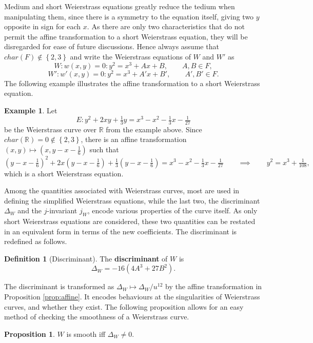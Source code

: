 \documentclass{article}
\newcommand{\R}{\mathbb{R}}
\newcommand{\rb}[1]{\left( #1 \right)}
\newcommand{\cb}[1]{\left\{ #1 \right\}}
\theoremstyle{definition}\newtheorem*{definition}{Definition}
\theoremstyle{definition}\newtheorem*{example}{Example}
\theoremstyle{definition}\newtheorem*{remark}{Remark}
\newtheorem{proposition}{Proposition}[subsection]
\begin{document}
Medium and short Weierstrass equations greatly reduce the tedium when manipulating them, since there is a symmetry to the equation itself, giving two $ y $ opposite in sign for each $ x $. As there are only two characteristics that do not permit the affine transformation to a short Weierstrass equation, they will be disregarded for ease of future discussions. Hence always assume that $ char\rb{F} \notin \cb{2, 3} $ and write the Weierstrass equations of $ W $ and $ W' $ as
$$ W : w\rb{x, y} = 0 : y^2 = x^3 + Ax + B, \qquad A, B \in F, $$
$$ W' : w'\rb{x, y} = 0 : y^2 = x^3 + A'x + B', \qquad A', B' \in F. $$
The following example illustrates the affine transformation to a short Weierstrass equation.

\begin{example}
Let
$$ E : y^2 + 2xy + \tfrac{1}{3}y = x^3 - x^2 - \tfrac{1}{3}x - \tfrac{1}{27} $$
be the Weierstrass curve over $ \R $ from the example above. Since $ char\rb{\R} = 0 \notin \cb{2, 3} $, there is an affine transformation $ \rb{x, y} \mapsto \rb{x, y - x - \tfrac{1}{6}} $ such that
$$ \rb{y - x - \tfrac{1}{6}}^2 + 2x\rb{y - x - \tfrac{1}{6}} + \tfrac{1}{3}\rb{y - x - \tfrac{1}{6}} = x^3 - x^2 - \tfrac{1}{3}x - \tfrac{1}{27} \qquad \implies \qquad y^2 = x^3 + \tfrac{1}{108}, $$
which is a short Weierstrass equation.
\end{example}

Among the quantities associated with Weierstrass curves, most are used in defining the simplified Weierstrass equations, while the last two, the discriminant $ \Delta_W $ and the $ j $-invariant $ j_W $, encode various properties of the curve itself. As only short Weierstrass equations are considered, these two quantities can be restated in an equivalent form in terms of the new coefficients. The discriminant is redefined as follows.

\begin{definition}[Discriminant]
The \textbf{discriminant} of $ W $ is
$$ \Delta_W = -16\rb{4A^3 + 27B^2}. $$
\end{definition}

The discriminant is transformed as $ \Delta_W \mapsto \Delta_W / u^{12} $ by the affine transformation in Proposition \ref{prop:affine}. It encodes behaviours at the singularities of Weierstrass curves, and whether they exist. The following proposition allows for an easy method of checking the smoothness of a Weierstrass curve.

\begin{proposition}
$ W $ is smooth iff $ \Delta_W \ne 0 $.
\end{proposition}
\end{document}
